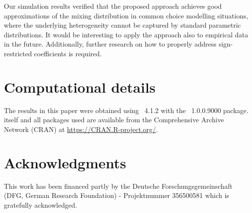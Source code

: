 \documentclass[article]{jss}
\begin{document}
Our simulation results verified that the proposed approach achieves good approximations of the mixing distribution in common choice modelling situations, where the underlying heterogeneity cannot be captured by standard parametric distributions. It would be interesting to apply the approach also to empirical data in the future. Additionally,
further research on how to properly address sign-restricted coefficients is required.


\section*{Computational details}

The results in this paper were obtained using
~4.1.2 with the
~1.0.0.9000 package.  itself
and all packages used are available from the Comprehensive
 Archive Network (CRAN) at \url{https://CRAN.R-project.org/}.


\section*{Acknowledgments}

This work has been financed partly by the Deutsche Forschungsgemeinschaft (DFG, German Research Foundation) - Projektnummer 356500581 which is gratefully acknowledged.





%
\end{document}

